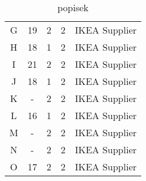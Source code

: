\documentclass[oneside,12pt]{article}%
\begin{document}
\begin{table}[h]
\begin{tabular}{c|c|ccc}
    G        & 19     & 2           & 2                                                          & IKEA Supplier                                                                  \\
    H        & 18     & 1           & 2                                                          & IKEA Supplier                                                                  \\
    I        & 21     & 2           & 2                                                          & IKEA Supplier                                                                  \\
    J        & 18     & 1           & 2                                                          & IKEA Supplier                                                                  \\
    K        & -      & 2           & 2                                                          & IKEA Supplier                                                                  \\
    L        & 16     & 1           & 2                                                          & IKEA Supplier                                                                  \\
    M        & -      & 2           & 2                                                          & IKEA Supplier                                                                  \\
    N        & -      & 2           & 2                                                          & IKEA Supplier                                                                  \\
    O        & 17     & 2           & 2                                                          & IKEA Supplier
  \end{tabular}
  \caption{popisek}
\end{table}
\end{document}
